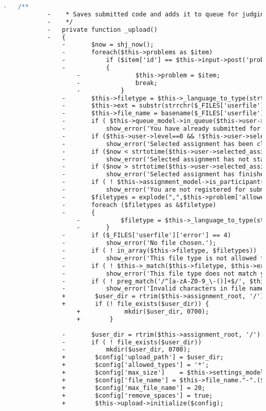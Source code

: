 \begin{lstlisting}[language=diff, caption=Perubahan pada kode Submit.php]
			-	/**
			-	 * Saves submitted code and adds it to queue for judging
			-	 */
			-	private function _upload()
			-	{
				-		$now = shj_now();
				-		foreach($this->problems as $item)
				-			if ($item['id'] == $this->input->post('problem'))
				-			{
					-				$this->problem = $item;
					-				break;
					-			}
				-		$this->filetype = $this->_language_to_type(strtolower(trim($this->input->post('language'))));
				-		$this->ext = substr(strrchr($_FILES['userfile']['name'],'.'),1); // uploaded file extension
				-		$this->file_name = basename($_FILES['userfile']['name'], ".{$this->ext}"); // uploaded file name without extension
				-		if ( $this->queue_model->in_queue($this->user->username,$this->user->selected_assignment['id'], $this->problem['id']) )
				-			show_error('You have already submitted for this problem. Your last submission is still in queue.');
				-		if ($this->user->level==0 && !$this->user->selected_assignment['open'])
				-			show_error('Selected assignment has been closed.');
				-		if ($now < strtotime($this->user->selected_assignment['start_time']))
				-			show_error('Selected assignment has not started.');
				-		if ($now > strtotime($this->user->selected_assignment['finish_time'])+$this->user->selected_assignment['extra_time'])
				-			show_error('Selected assignment has finished.');
				-		if ( ! $this->assignment_model->is_participant($this->user->selected_assignment['participants'],$this->user->username) )
				-			show_error('You are not registered for submitting.');
				-		$filetypes = explode(",",$this->problem['allowed_languages']);
				-		foreach ($filetypes as &$filetype)
				-		{
					-			$filetype = $this->_language_to_type(strtolower(trim($filetype)));
					-		}
				-		if ($_FILES['userfile']['error'] == 4)
				-			show_error('No file chosen.');
				-		if ( ! in_array($this->filetype, $filetypes))
				-			show_error('This file type is not allowed for this problem.');
				-		if ( ! $this->_match($this->filetype, $this->ext) )
				-			show_error('This file type does not match your selected language.');
				-		if ( ! preg_match('/^[a-zA-Z0-9_\-()]+$/', $this->file_name) )
				-			show_error('Invalid characters in file name.');
				+        $user_dir = rtrim($this->assignment_root, '/').'/assignment_'.$this->user->selected_assignment['id'].'/p'.$this->problem['id'].'/'.$this->user->username;
				+        if (! file_exists($user_dir)) {
					+            mkdir($user_dir, 0700);
					+        }
				
				-		$user_dir = rtrim($this->assignment_root, '/').'/assignment_'.$this->user->selected_assignment['id'].'/p'.$this->problem['id'].'/'.$this->user->username;
				-		if ( ! file_exists($user_dir))
				-			mkdir($user_dir, 0700);
				+        $config['upload_path'] = $user_dir;
				+        $config['allowed_types'] = '*';
				+        $config['max_size']	= $this->settings_model->get_setting('file_size_limit');
				+        $config['file_name'] = $this->file_name."-".($this->user->selected_assignment['total_submits'] + 1).".".$this->ext;
				+        $config['max_file_name'] = 20;
				+        $config['remove_spaces'] = true;
				+        $this->upload->initialize($config);
				

\end{lstlisting}
